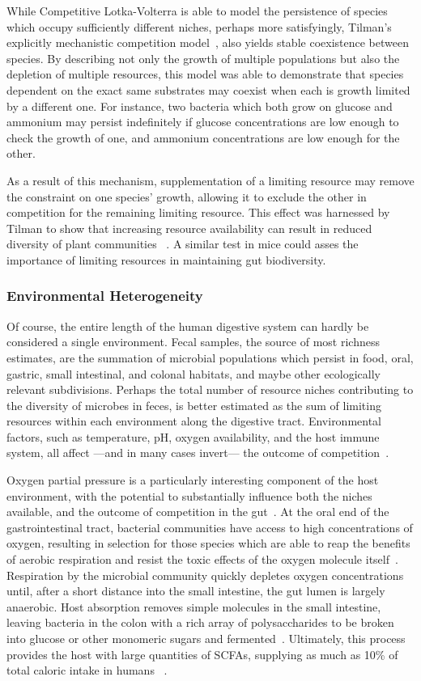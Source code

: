 \documentclass[12pt]{article}
\begin{document}
While Competitive Lotka-Volterra is able to model the
persistence of species which occupy sufficiently different
niches,
perhaps more satisfyingly,
Tilman's explicitly mechanistic competition model~\citep{Tilman1977},
also yields stable coexistence between species.
By describing not only the growth of multiple populations
but also the depletion of multiple resources,
this model was able to demonstrate that
species dependent on the exact same substrates may coexist
when each is growth limited by a different one.
For instance, two bacteria which both grow on glucose and
ammonium may persist indefinitely if glucose concentrations are
low enough to check the growth of one, and ammonium
concentrations are low enough for the other.

As a result of this mechanism, supplementation of a
limiting resource may remove the constraint on one species'
growth, allowing it to exclude the other in competition for
the remaining limiting resource.
This effect was harnessed by Tilman to show that increasing
resource availability can result in reduced diversity of plant communities%
~\citep{Harpole2007}.
A similar test in mice could asses the importance of limiting
resources in maintaining gut biodiversity.

\subsubsection{Environmental Heterogeneity}
Of course, the entire length of the human digestive system can
hardly be considered a single environment.
Fecal samples, the source of most richness estimates, are the
summation of microbial populations which persist in
food, oral, gastric, small intestinal, and colonal habitats,
and maybe other ecologically relevant subdivisions.
Perhaps the total number of resource niches contributing
to the diversity of microbes in feces,
is better estimated as the sum of limiting resources
within each environment along the digestive tract.
Environmental factors, such as temperature, pH,
oxygen availability, and the host immune system,
all affect%
---and in many cases invert---%
the outcome of competition~\citep{Human2012}.

Oxygen partial pressure is a particularly interesting
component of the host environment, with the potential
to substantially influence both the niches available,
and the outcome of competition in the gut~\citep{Espey2013}.
At the oral end of the gastrointestinal tract, bacterial
communities have access to high concentrations of oxygen,
resulting in selection for those species which are able to
reap the benefits of aerobic respiration
and resist the toxic effects of the oxygen molecule itself~\citep{Zhang2014}.
Respiration by the microbial community quickly depletes
oxygen concentrations until,
after a short distance into the small intestine,
the gut lumen is largely anaerobic.
Host absorption removes simple molecules in the small
intestine,
leaving bacteria in the colon with a
rich array of polysaccharides to be broken into glucose or
other monomeric sugars and fermented~\citep[reviewed in][]{Macfarlane2012}.
Ultimately, this process provides the host with large
quantities of \glspl*{SCFA},
supplying as much as 10\% of total caloric intake in humans%
~\citep{McNeil1984}.
\end{document}
